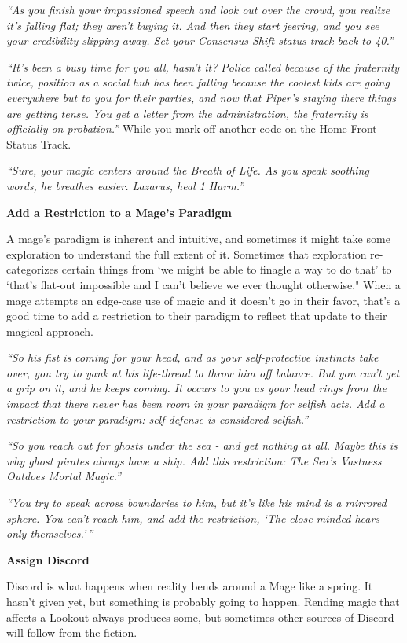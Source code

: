 \documentclass[
  oneside,
  statementpaper,
  9pt]{memoir}
\begin{document}
\emph{``As you finish your impassioned speech and look out over the
crowd, you realize it's falling flat; they aren't buying it. And then
they start jeering, and you see your credibility slipping away. Set your
Consensus Shift status track back to 40.''}

\emph{``It's been a busy time for you all, hasn't it? Police called
because of the fraternity twice, position as a social hub has been
falling because the coolest kids are going everywhere but to you for
their parties, and now that Piper's staying there things are getting
tense. You get a letter from the administration, the fraternity is
officially on probation.''} While you mark off another code on the Home
Front Status Track.

\emph{``Sure, your magic centers around the Breath of Life. As you speak
soothing words, he breathes easier. Lazarus, heal 1 Harm.''}

\textbf{Add a Restriction to a Mage's Paradigm}

A mage's paradigm is inherent and intuitive, and sometimes it might take
some exploration to understand the full extent of it. Sometimes that
exploration re-categorizes certain things from `we might be able to
finagle a way to do that' to `that's flat-out impossible and I can't
believe we ever thought otherwise." When a mage attempts an edge-case
use of magic and it doesn't go in their favor, that's a good time to add
a restriction to their paradigm to reflect that update to their magical
approach.

\emph{``So his fist is coming for your head, and as your self-protective
instincts take over, you try to yank at his life-thread to throw him off
balance. But you can't get a grip on it, and he keeps coming. It occurs
to you as your head rings from the impact that there never has been room
in your paradigm for selfish acts. Add a restriction to your paradigm:
self-defense is considered selfish.''}

\emph{``So you reach out for ghosts under the sea - and get nothing at
all. Maybe this is why ghost pirates always have a ship. Add this
restriction: The Sea's Vastness Outdoes Mortal Magic.''}

\emph{``You try to speak across boundaries to him, but it's like his
mind is a mirrored sphere. You can't reach him, and add the restriction,
`The close-minded hears only themselves.'\,''}

\textbf{Assign Discord}

Discord is what happens when reality bends around a Mage like a spring.
It hasn't given yet, but something is probably going to happen. Rending
magic that affects a Lookout always produces some, but sometimes other
sources of Discord will follow from the fiction.
\end{document}

